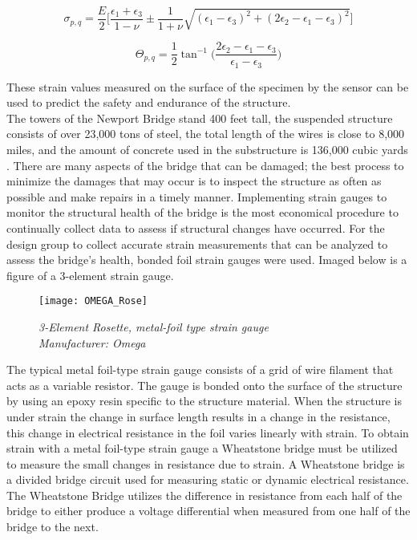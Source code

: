 \begin{equation}
\sigma_{p,q} = \frac{E}{2}\biggl[\frac{\epsilon_{1}+\epsilon_{3}}{1-\nu}\pm \frac{1}{1+\nu}\sqrt{(\epsilon_{1}-\epsilon_{3})^{2}+(2\epsilon_{2}-\epsilon_{1}-\epsilon_{3})^{2}}\biggr]
\label{eqn:Strain_Sig}
\end{equation}

\begin{equation}
\Theta_{p,q} = \frac{1}{2} \tan^{-1}\biggl(\frac{2\epsilon_{2}-\epsilon_{1}-\epsilon_{3}}{\epsilon_{1}-\epsilon_{3}}\biggr)
\label{eqn:Strain_Theta}
\end{equation}

\noindent These strain values measured on the surface of the specimen by the sensor can be used to predict the safety and endurance of the structure.\\
\indent The towers of the Newport Bridge stand 400 feet tall, the suspended structure consists of over 23,000 tons of steel, the total length of the wires is close to 8,000 miles, and the amount of concrete used in the substructure is 136,000 cubic yards \cite{Structurae:2013}. There are many aspects of the bridge that can be damaged; the best process to minimize the damages that may occur is to inspect the structure as often as possible and make repairs in a timely manner. Implementing strain gauges to monitor the structural health of the bridge is the most economical procedure to continually collect data to assess if structural changes have occurred. For the design group to collect accurate strain measurements that can be analyzed to assess the bridge's health, bonded foil strain gauges were used. Imaged below is a figure of a 3-element strain gauge. 

\begin{figure}[H]
\centering
\texttt{[image: OMEGA\_Rose]}
\caption{\textit{3-Element Rosette, metal-foil type strain gauge\\Manufacturer: Omega}}
\label{fig:STRAIN_Rose}
\end{figure}

\indent The typical metal foil-type strain gauge consists of a grid of wire filament that acts as a variable resistor. The gauge is bonded onto the surface of the structure by using an epoxy resin specific to the structure material. When the structure is under strain the change in surface length results in a change in the resistance, this change in electrical resistance in the foil varies linearly with strain. To obtain strain with a metal foil-type strain gauge a Wheatstone bridge must be utilized to measure the small changes in resistance due to strain. A Wheatstone bridge is a divided bridge circuit used for measuring static or dynamic electrical resistance. The Wheatstone Bridge utilizes the difference in resistance from each half of the bridge to either produce a voltage differential when measured from one half of the bridge to the next.


